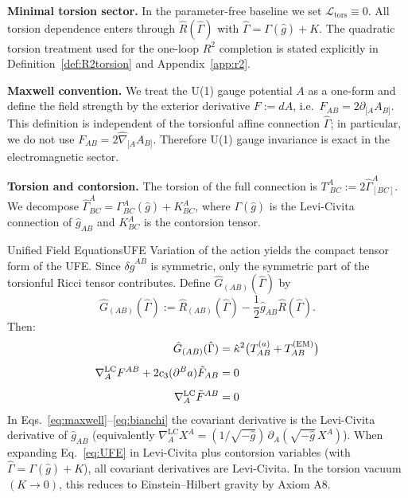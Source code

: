 \noindent\textbf{Minimal torsion sector.} In the parameter-free baseline we set $\mathcal{L}_{\mathrm{tors}}\equiv 0$.
All torsion dependence enters through $\hat{R}(\hat{\Gamma})$ with $\hat{\Gamma}=\Gamma(\hat{g})+K$.
The quadratic torsion treatment used for the one-loop $R^2$ completion is stated explicitly in Definition~\ref{def:R2torsion} and Appendix~\ref{app:r2}.

\noindent\textbf{Maxwell convention.} We treat the U(1) gauge potential $A$ as a one-form and define the field strength by the exterior derivative
$F := dA$, i.e.\ $F_{AB}=2\partial_{[A}A_{B]}$. This definition is independent of the torsionful affine connection $\hat{\Gamma}$; in particular, we do not use $F_{AB}=2\hat{\nabla}_{[A}A_{B]}$. Therefore U(1) gauge invariance is exact in the electromagnetic sector.

\noindent\textbf{Torsion and contorsion.} The torsion of the full connection is $T^A_{\;BC}:=2\hat{\Gamma}^A_{[BC]}$. We decompose
$\hat{\Gamma}^A_{BC}=\Gamma^A_{BC}(\hat{g})+K^A_{BC}$, where $\Gamma(\hat{g})$ is the Levi-Civita connection of $\hat{g}_{AB}$ and $K^A_{BC}$ is the contorsion tensor.

\begin{theorem}{Unified Field Equations}{UFE}
Variation of the action yields the compact tensor form of the UFE. Since $\delta\hat{g}^{AB}$ is symmetric, only the symmetric part of the torsionful Ricci tensor contributes. Define
$\hat{G}_{(AB)}(\hat{\Gamma})$ by
\begin{equation*}
    \hat{G}_{(AB)}(\hat{\Gamma}) := \hat{R}_{(AB)}(\hat{\Gamma}) - \frac{1}{2}\hat{g}_{AB}\hat{R}(\hat{\Gamma}).
\end{equation*}
Then:
\begin{align}
    \hat{G}_{(AB)}(\hat{\Gamma})
        &= \hat{\kappa}^2\bigl(T^{(a)}_{AB} + T^{(\text{EM})}_{AB}\bigr)
        \label{eq:UFE}\\[0.5em]
    \nabla^{\mathrm{LC}}_A F^{AB} + 2c_3(\partial^B a)\tilde{F}_{AB} &= 0
        \label{eq:maxwell}\\[0.5em]
    \nabla^{\mathrm{LC}}_A\tilde{F}^{AB} &= 0
        \label{eq:bianchi}
\end{align}
In Eqs.~\eqref{eq:maxwell}--\eqref{eq:bianchi} the covariant derivative is the Levi-Civita derivative of $\hat{g}_{AB}$ (equivalently $\nabla^{\mathrm{LC}}_A X^A=(1/\sqrt{-\hat{g}})\,\partial_A(\sqrt{-\hat{g}}\,X^A)$).
When expanding Eq.~\eqref{eq:UFE} in Levi-Civita plus contorsion variables (with $\hat{\Gamma}=\Gamma(\hat{g})+K$), all covariant derivatives are Levi-Civita.
In the torsion vacuum $(K \to 0)$, this reduces to Einstein--Hilbert gravity 
by Axiom A8.
\end{theorem}

